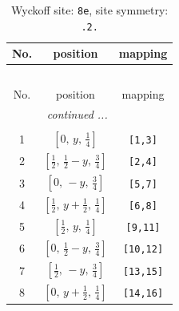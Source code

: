 \documentclass[fleqn,8pt]{jsarticle}
\begin{document}
\begin{longtable}{ccc}
\caption{Wyckoff site: {\tt 8e}, site symmetry: {\tt .2.}}
 \\
 \hline \hline
No. & position & mapping \\ \hline \endfirsthead

\multicolumn{2}{l}{\tablename\ \thetable{}} \\
 \hline \hline
No. & position & mapping \\ \hline \endhead

 \hline \hline
\multicolumn{2}{r}{\footnotesize\it continued ...} \\ \endfoot

 \hline \hline
\multicolumn{2}{r}{} \\ \endlastfoot

1 & $\left[ 0,\, y,\, \frac{1}{4} \right]$ & {\tt [1,3]} \\ \hline
2 & $\left[ \frac{1}{2},\, \frac{1}{2} - y,\, \frac{3}{4} \right]$ & {\tt [2,4]} \\ \hline
3 & $\left[ 0,\, - y,\, \frac{3}{4} \right]$ & {\tt [5,7]} \\ \hline
4 & $\left[ \frac{1}{2},\, y + \frac{1}{2},\, \frac{1}{4} \right]$ & {\tt [6,8]} \\ \hline
5 & $\left[ \frac{1}{2},\, y,\, \frac{1}{4} \right]$ & {\tt [9,11]} \\ \hline
6 & $\left[ 0,\, \frac{1}{2} - y,\, \frac{3}{4} \right]$ & {\tt [10,12]} \\ \hline
7 & $\left[ \frac{1}{2},\, - y,\, \frac{3}{4} \right]$ & {\tt [13,15]} \\ \hline
8 & $\left[ 0,\, y + \frac{1}{2},\, \frac{1}{4} \right]$ & {\tt [14,16]} \\
\end{longtable}
\renewcommand{\arraystretch}{1.2}
\end{document}
